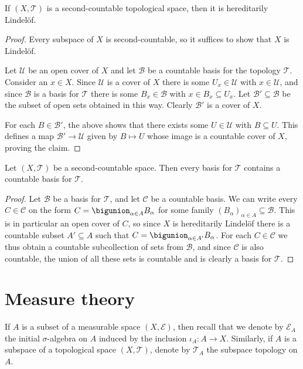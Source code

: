 \documentclass[article, a4paper, 11pt, oneside]{memoir}
\numberwithin{equation}{chapter}
\newcommand{\calT}{\mathcal{T}}
\newcommand{\calU}{\mathcal{U}}
\newcommand{\calB}{\mathcal{B}}
\newcommand{\calE}{\mathcal{E}}
\newcommand{\calC}{\mathcal{C}}
\begin{document}
\begin{proposition}
    If $(X,\calT)$ is a second-countable topological space, then it is hereditarily Lindelöf.
\end{proposition}

\begin{proof}
    Every subspace of $X$ is second-countable, so it suffices to show that $X$ is Lindelöf.
    
    Let $\calU$ be an open cover of $X$ and let $\calB$ be a countable basis for the topology $\calT$. Consider an $x \in X$. Since $\calU$ is a cover of $X$ there is some $U_x \in \calU$ with $x \in \calU$, and since $\calB$ is a basis for $\calT$ there is some $B_x \in \calB$ with $x \in B_x \subseteq U_x$. Let $\calB' \subseteq \calB$ be the subset of open sets obtained in this way. Clearly $\calB'$ is a cover of $X$.
    
    For each $B \in \calB'$, the above shows that there exists some $U \in \calU$ with $B \subseteq U$. This defines a map $\calB' \to \calU$ given by $B \mapsto U$ whose image is a countable cover of $X$, proving the claim.
\end{proof}


\begin{lemma}
    \label{thm:countable_basis}
    Let $(X, \calT)$ be a second-countable space. Then every basis for $\calT$ contains a countable basis for $\calT$.
\end{lemma}

\begin{proof}
    Let $\calB$ be a basis for $\calT$, and let $\calC$ be a countable basis. We can write every $C \in \calC$ on the form $C = \bigunion_{\alpha \in A} B_\alpha$ for some family $(B_\alpha)_{\alpha \in A} \subseteq \calB$. This is in particular an open cover of $C$, so since $X$ is hereditarily Lindelöf there is a countable subset $A' \subseteq A$ such that $C = \bigunion_{\alpha \in A'} B_\alpha$. For each $C \in \calC$ we thus obtain a countable subcollection of sets from $\calB$, and since $\calC$ is also countable, the union of all these sets is countable and is clearly a basis for $\calT$.
\end{proof}





\chapter{Measure theory}

If $A$ is a subset of a measurable space $(X, \calE)$, then recall that we denote by $\calE_A$ the initial $\sigma$-algebra on $A$ induced by the inclusion $\iota_A \colon A \to X$. Similarly, if $A$ is a subspace of a topological space $(X, \calT)$, denote by $\calT_A$ the subspace topology on $A$.
\end{document}
